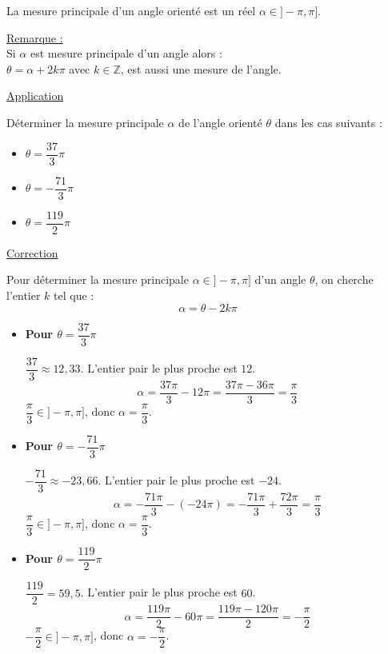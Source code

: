 \documentclass[12pt,a4paper]{article}
\begin{document}
\noindent La \textcolor{monRouge}{mesure principale} d'un angle orienté est un réel $\alpha \in ]-\pi, \pi]$.

\vspace{1em}

\noindent \textcolor{monRouge}{\underline{Remarque :}} \\
Si $\alpha$ est mesure principale d'un angle alors : \\
\textcolor{monRouge}{$\theta = \alpha + 2k\pi$} avec $k \in \mathbb{Z}$, est aussi une mesure de l'angle.

\begin{center}
    \textcolor{monRouge}{\underline{\Large Application}}
\end{center}

\noindent Déterminer la mesure principale $\alpha$ de l'angle orienté $\theta$ dans les cas suivants :

\begin{itemize}
    \item[a)] $\theta = \dfrac{37}{3}\pi$
    \item[b)] $\theta = -\dfrac{71}{3}\pi$
    \item[c)] $\theta = \dfrac{119}{2}\pi$
\end{itemize}

\vspace{1.5em}

\noindent \textcolor{monRouge}{\underline{Correction}}

\noindent Pour déterminer la mesure principale $\alpha \in ]-\pi, \pi]$ d'un angle $\theta$, on cherche l'entier $k$ tel que :
\[ \alpha = \theta - 2k\pi \]

\begin{itemize}
    \item[a)] \textbf{Pour $\theta = \dfrac{37}{3}\pi$}
    
    $\dfrac{37}{3} \approx 12,33$. L'entier pair le plus proche est $12$.
    \[ \alpha = \dfrac{37\pi}{3} - 12\pi = \dfrac{37\pi - 36\pi}{3} = \dfrac{\pi}{3} \]
    $\dfrac{\pi}{3} \in ]-\pi, \pi]$, donc \textcolor{monRouge}{$\alpha = \dfrac{\pi}{3}$}.

    \item[b)] \textbf{Pour $\theta = -\dfrac{71}{3}\pi$}
    
    $-\dfrac{71}{3} \approx -23,66$. L'entier pair le plus proche est $-24$.
    \[ \alpha = -\dfrac{71\pi}{3} - (-24\pi) = -\dfrac{71\pi}{3} + \dfrac{72\pi}{3} = \dfrac{\pi}{3} \]
    $\dfrac{\pi}{3} \in ]-\pi, \pi]$, donc \textcolor{monRouge}{$\alpha = \dfrac{\pi}{3}$}.

    \item[c)] \textbf{Pour $\theta = \dfrac{119}{2}\pi$}
    
    $\dfrac{119}{2} = 59,5$. L'entier pair le plus proche est $60$.
    \[ \alpha = \dfrac{119\pi}{2} - 60\pi = \dfrac{119\pi - 120\pi}{2} = -\dfrac{\pi}{2} \]
    $-\dfrac{\pi}{2} \in ]-\pi, \pi]$, donc \textcolor{monRouge}{$\alpha = -\dfrac{\pi}{2}$}.
\end{itemize}
\end{document}
